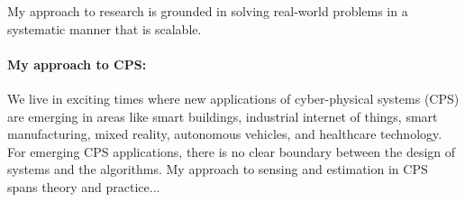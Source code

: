 \documentclass[10pt]{article}
\begin{document}
My approach to research is grounded in solving real-world problems in a systematic manner that is scalable.  \\

\paragraph{My approach to CPS: }
We live in exciting times where new applications of cyber-physical systems
(CPS) are emerging in areas like smart buildings, industrial internet of things, smart manufacturing, mixed reality, autonomous vehicles, and healthcare technology. %
For emerging CPS applications, there is no clear boundary between the design of systems and the algorithms. %
My approach to sensing and estimation in CPS spans theory and practice... %





\end{document}

